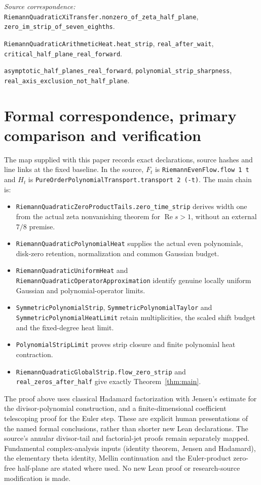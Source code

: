 \documentclass[11pt]{article}
\newcommand{\code}[1]{{\small\nolinkurl{#1}}}
\begin{document}
\par\noindent\begingroup\small\raggedright
\textit{Source correspondence:}
\code{RiemannQuadraticXiTransfer.nonzero_of_zeta_half_plane},
\code{zero_im_strip_of_seven_eighths}.
\par\noindent
\code{RiemannQuadraticArithmeticHeat.heat_strip},
\code{real_after_wait}, \code{critical_half_plane_real_forward}.
\par\noindent
\code{asymptotic_half_planes_real_forward},
\code{polynomial_strip_sharpness},
\code{real_axis_exclusion_not_half_plane}.
\par\endgroup

\section{Formal correspondence, primary comparison and verification}
The map supplied with this paper records exact declarations, source
hashes and line links at the fixed baseline. In the source,
$F_t$ is \code{RiemannEvenFlow.flow 1 t} and $H_t$ is
\code{PureOrderPolynomialTransport.transport 2 (-t)}.
The main chain is:
\begin{itemize}
\item \code{RiemannQuadraticZeroProductTails.zero_time_strip} derives
width one from the actual zeta nonvanishing theorem for
$\operatorname{Re}s>1$, without an external $7/8$ premise.
\item \code{RiemannQuadraticPolynomialHeat} supplies the actual even
polynomials, disk-zero retention, normalization and common Gaussian budget.
\item \code{RiemannQuadraticUniformHeat} and
\code{RiemannQuadraticOperatorApproximation} identify genuine locally
uniform Gaussian and polynomial-operator limits.
\item \code{SymmetricPolynomialStrip},
\code{SymmetricPolynomialTaylor} and
\code{SymmetricPolynomialHeatLimit} retain multiplicities, the scaled
shift budget and the fixed-degree heat limit.
\item \code{PolynomialStripLimit} proves strip closure and finite
polynomial heat contraction.
\item \code{RiemannQuadraticGlobalStrip.flow_zero_strip} and
\code{real_zeros_after_half} give exactly Theorem~\ref{thm:main}.
\end{itemize}
The proof above uses classical Hadamard factorization with Jensen's
estimate for the divisor-polynomial construction, and a finite-dimensional
coefficient telescoping proof for the Euler step. These are explicit human
presentations of the named formal conclusions, rather than shorter new
Lean declarations. The source's annular divisor-tail and factorial-jet
proofs remain separately mapped. Fundamental complex-analysis inputs
(identity theorem, Jensen and Hadamard), the elementary theta identity,
Mellin continuation and the Euler-product zero-free half-plane are stated
where used. No new Lean proof or research-source modification is made.
\end{document}
